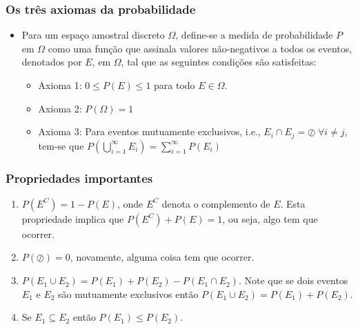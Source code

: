 \begin{frame}
    \frametitle{Os três axiomas da probabilidade}
    
    \begin{itemize}
     \item Para um espaço amostral discreto $\Omega$, define-se a medida de probabilidade $P$ em $\Omega$ como uma função que assinala valores não-negativos a todos os eventos, denotados por $E$, em $\Omega$, tal que as seguintes condições são satisfeitas:
    \begin{itemize}
     \item Axioma 1: $0 \leq P(E) \leq 1$ para todo $E \in \Omega$.
     \item Axioma 2: $P(\Omega) = 1$
     \item Axioma 3: Para eventos mutuamente exclusivos, i.e., $E_i \cap E_j = \oslash \; \forall i \neq j$, tem-se que $P(\bigcup\limits_{i=1}^{\infty} E_i) = \sum\limits_{i=1}^{\infty} P(E_i)$
    \end{itemize}

    \end{itemize}
\end{frame}

\begin{frame}
    \frametitle{Propriedades importantes}
    
    \begin{enumerate}
      \item $P(E^C) = 1 - P(E)$, onde $E^C$ denota o complemento de $E$. Esta propriedade implica que $P(E^C) + P(E) = 1$, ou seja, algo tem que ocorrer.
      \item $P(\oslash) = 0$, novamente, alguma coisa tem que ocorrer.
      \item $P(E_1 \cup E_2) = P(E_1) + P(E_2) - P(E_1 \cap E_2)$. Note que se dois eventos $E_1$ e $E_2$ são mutuamente exclusivos então $P(E_1 \cup E_2) = P(E_1) + P(E_2)$.
      \item Se $E_1 \subseteq E_2$ então $P(E_1) \leq P(E_2)$. 
    \end{enumerate}
\end{frame}


